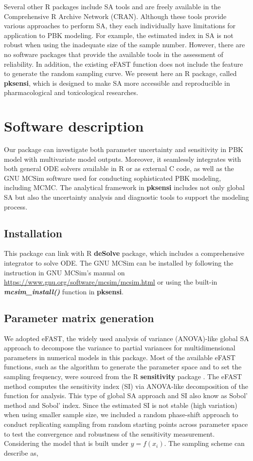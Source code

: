 \documentclass[preprint,12pt, a4paper]{elsarticle}
\begin{document}
Several other R packages include SA tools and are freely available in the Comprehensive R Archive Network (CRAN). Although these tools provide various approaches to perform SA, they each individually have limitations for application to PBK modeling. For example, the estimated index in SA is not robust when using the inadequate size of the sample number. However, there are no software packages that provide the available tools in the assessment of reliability. In addition, the existing eFAST function does not include the feature to generate the random sampling curve. We present here an R package, called \textbf{pksensi}, which is designed to make SA more accessible and reproducible in pharmacological and toxicological researches. 


\section{Software description}

Our package can investigate both parameter uncertainty and sensitivity in PBK model with multivariate model outputs. Moreover, it seamlessly integrates with both general ODE solvers available in R or as external C code, as well as the GNU MCSim software used for conducting sophisticated PBK modeling, including MCMC. The analytical framework in \textbf{pksensi} includes not only global SA but also the uncertainty analysis and diagnostic tools to support the modeling process.


\subsection{Installation}

This package can link with R \textbf{deSolve} package, which includes a comprehensive integrator to solve ODE. The GNU MCSim can be installed by following the instruction in GNU MCSim's manual on \url{https://www.gnu.org/software/mcsim/mcsim.html} or using the built-in \textbf{\textit{mcsim\_install()}} function in \textbf{pksensi}.

\subsection{Parameter matrix generation}

We adopted eFAST, the widely used analysis of variance (ANOVA)-like global SA approach to decompose the variance to partial variances for multidimensional parameters in numerical models in this package. Most of the available eFAST functions, such as the algorithm to generate the parameter space and to set the sampling frequency, were sourced from the R \textbf{sensitivity} package \cite{R-sensitivity}. The eFAST method computes the sensitivity index (SI) via ANOVA-like decomposition of the function for analysis. This type of global SA approach and SI also know as Sobol' method and Sobol' index. Since the estimated SI is not stable (high variation) when using smaller sample size, we included a random phase-shift approach to conduct replicating sampling from random starting points across parameter space to test the convergence and robustness of the sensitivity measurement. Considering the model that is built under \(y=f(x_{i})\). The sampling scheme can describe as,
\end{document}
